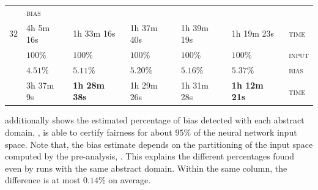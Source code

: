 \begin{table}[t]
{\begin{tabular}{ P{3em}  P{6em}  P{6em}  P{6em}  P{6em} P{6em} P{2.4em} }
    & \textsc{bias} \\
     & 4h 5m 16s & 1h 33m 16s & 1h 37m 40s & 1h 39m 19s & 1h 19m 23s
    & \textsc{time} \\
    \midrule
      & $100\%$ & $100\%$ & $100\%$ & $100\%$ & $100\%$
    & \textsc{input} \\
    & $4.51\%$ & $5.11\%$ & $5.20\%$ & $5.16\%$ & $5.37\%$
    & \textsc{bias} \\
       & 3h 37m 9s & \textbf{1h 28m 38s} & 1h 29m 26s & 1h 31m 28s & \textbf{1h 12m 21s}
    & \textsc{time} \\
    \bottomrule
    \end{tabular}
}
\end{table}

 additionally shows the estimated percentage of bias detected with each abstract domain, \ie, \libra{} is able to certify fairness for about $95\%$ of the neural network input space. Note that, the bias estimate depends on the partitioning of the input space computed by the pre-analysis, \cf{} . This explains the different percentages found even by runs with the same abstract domain. Within the same column, the difference is at most $0.14\%$ on average.


